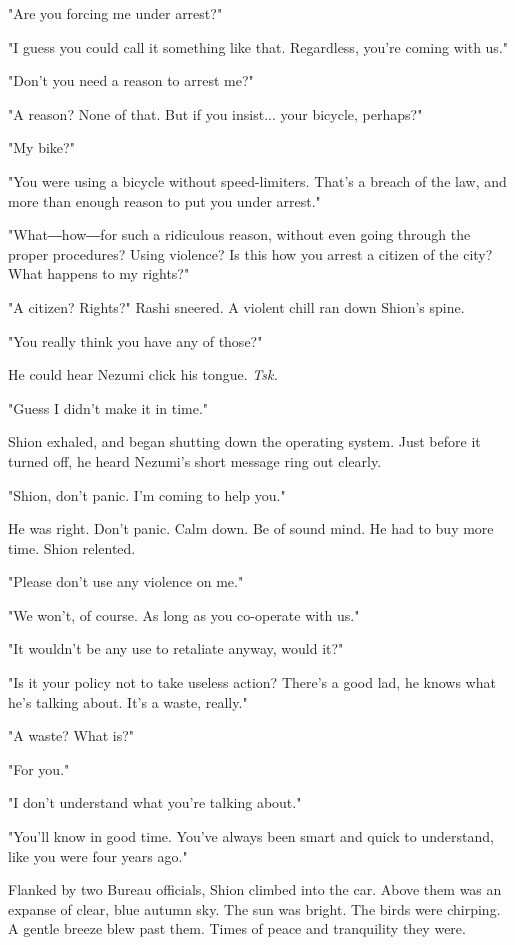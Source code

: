 "Are you forcing me under arrest?"

"I guess you could call it something like that. Regardless, you're
coming with us."

"Don't you need a reason to arrest me?"

"A reason? None of that. But if you insist... your bicycle, perhaps?"

"My bike?"

"You were using a bicycle without speed-limiters. That's a breach of the
law, and more than enough reason to put you under arrest."

"What―how―for such a ridiculous reason, without even going through the
proper procedures? Using violence? Is this how you arrest a citizen of
the city? What happens to my rights?"

"A citizen? Rights?" Rashi sneered. A violent chill ran down Shion's
spine.

"You really think you have any of those?"

He could hear Nezumi click his tongue. \emph{Tsk.}

"Guess I didn't make it in time."

Shion exhaled, and began shutting down the operating system. Just before
it turned off, he heard Nezumi's short message ring out clearly.

"Shion, don't panic. I'm coming to help you."

\mybreak

He was right. Don't panic. Calm down. Be of sound mind. He had to buy
more time. Shion relented.

"Please don't use any violence on me."

"We won't, of course. As long as you co-operate with us."

"It wouldn't be any use to retaliate anyway, would it?"

"Is it your policy not to take useless action? There's a good lad, he
knows what he's talking about. It's a waste, really."

"A waste? What is?"

"For you."

"I don't understand what you're talking about."

"You'll know in good time. You've always been smart and quick to
understand, like you were four years ago."

Flanked by two Bureau officials, Shion climbed into the car. Above them
was an expanse of clear, blue autumn sky. The sun was bright. The birds
were chirping. A gentle breeze blew past them. Times of peace and
tranquility they were.

